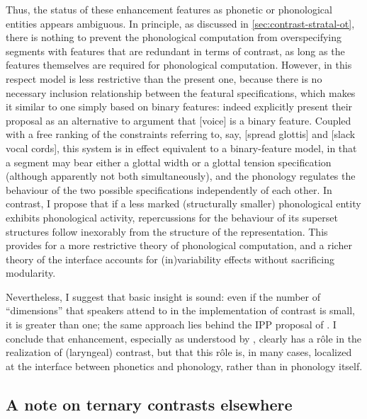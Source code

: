 Thus, the status of these enhancement features as phonetic or phonological entities appears ambiguous. In principle, as discussed in \cref{sec:contrast-stratal-ot}, there is nothing to prevent the phonological computation from overspecifying segments with features that are redundant in terms of contrast, as long as the features themselves are required for phonological computation. However, in this respect  model is less restrictive than the present one, because there is no necessary inclusion relationship between the featural specifications, which makes it similar to one simply based on binary features: indeed \citet{iverson03:_legac_dutch} explicitly present their proposal as an alternative to  argument that [voice] is a binary feature. Coupled with a free ranking of the constraints referring to, say, [spread glottis] and [slack vocal cords], this system is in effect equivalent to a binary\hyp feature model, in that a segment may bear either a glottal width or a glottal tension specification (although apparently not both simultaneously), and the phonology regulates the behaviour of the two possible specifications independently of each other. In contrast, I propose that if a less marked (\ie structurally smaller) phonological entity exhibits phonological activity, repercussions for the behaviour of its superset structures follow inexorably from the structure of the representation. This provides for a more restrictive theory of phonological computation, and a richer theory of the interface accounts for (in)variability effects without sacrificing modularity.

Nevertheless, I suggest that  basic insight is sound: even if the number of \enquote{dimensions} that speakers attend to in the implementation of contrast is small, it is greater than one; the same approach lies behind the IPP proposal of \citet{kingston95:_inter,kingston08,kingston09:_voice}. I conclude that enhancement, especially as understood by \citet{avery01:_laryn}, clearly has a rôle in the realization of (laryngeal) contrast, but that this rôle is, in many cases, localized at the interface between phonetics and phonology, rather than in phonology itself.

\subsection{A note on ternary contrasts elsewhere}
\label{sec:note-tern-contr}

